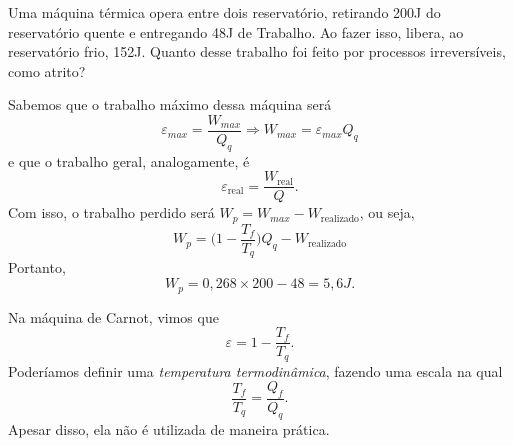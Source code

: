 \documentclass[phsyicsII_notes.tex]{subfiles}
\begin{document}
\begin{example}
	Uma máquina térmica opera entre dois reservatório, retirando 200J do reservatório quente e entregando 48J de Trabalho. Ao fazer isso, libera, ao reservatório frio, 152J.
	Quanto desse trabalho foi feito por processos irreversíveis, como atrito?

	Sabemos que o trabalho máximo dessa máquina será
	\[
		\varepsilon_{max} = \frac{W_{max}}{Q_{q}} \Rightarrow W_{max} = \varepsilon_{max}Q_{q}
	\]
	e que o trabalho geral, analogamente, é
	\[
		\varepsilon_{\text{real}}  = \frac{W_{\text{real}}}{Q}.
	\]
	Com isso, o trabalho perdido será \(W_{p} = W_{max} - W_{\text{realizado}}\), ou seja,
	\[
		W_{p} = \biggl(1 - \frac{T_{f}}{T_{q}}\biggr)Q_{q} - W_{\text{realizado}}
	\]
	Portanto,
	\[
		W_{p} = 0,268\times 200 - 48 = 5,6J.
	\]
\end{example}
Na máquina de Carnot, vimos que
\[
	\varepsilon  = 1 - \frac{T_{f}}{T_{q}}.
\]
Poderíamos definir uma \textit{temperatura termodinâmica}, fazendo uma escala na qual
\[
	\frac{T_{f}}{T_{q}} = \frac{Q_{f}}{Q_{q}}.
\]
Apesar disso, ela não é utilizada de maneira prática.
\end{document}
